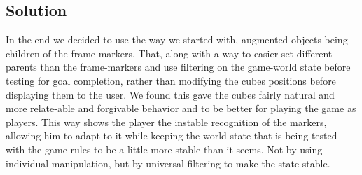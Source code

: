 \subsection{Solution}
In the end we decided to use the way we started with, augmented objects being children of the frame markers.
That, along with a way to easier set different parents than the frame-markers and use filtering on the game-world state before testing for goal completion, rather than modifying the cubes positions before displaying them to the user.
We found this gave the cubes fairly natural and more relate-able and forgivable behavior and to be better for playing the game as players. 
This way shows the player the instable recognition of the markers, allowing him to adapt to it while keeping the world state that is being tested with the game rules to be a little more stable than it seems. 
Not by using individual manipulation, but by universal filtering to make the state stable.